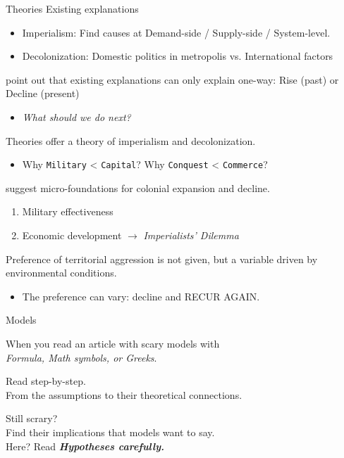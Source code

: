 \documentclass[xcolor=dvipsnames]{beamer}
\begin{document}
	\begin{frame}[fragile]{Theories}
		Existing explanations
		\begin{itemize}
			\item Imperialism: Find causes at Demand-side / Supply-side / System-level.
			\item Decolonization: Domestic politics in metropolis vs. International factors
		\end{itemize}
		\cite{Gartzke2011} point out that existing explanations can only explain one-way: \pause Rise (past) or Decline (present)  \pause
		\begin{itemize}
			\item[] \centering\textit{What should we do next?}
		\end{itemize}
		
	\end{frame}
	
	\begin{frame}[fragile]{Theories}
		\citet{Gartzke2011} offer a theory of imperialism and decolonization.
		\begin{itemize}
			\item Why \texttt{Military} < \texttt{Capital}? Why \texttt{Conquest} < \texttt{Commerce}?
		\end{itemize}\pause
		\citet{Gartzke2011} suggest micro-foundations for colonial expansion and decline. \pause
		\begin{enumerate}
			\item Military effectiveness
			\item Economic development $\rightarrow$ \textit{Imperialists' Dilemma}
		\end{enumerate}\pause
		Preference of territorial aggression is not given, but a variable driven by environmental conditions.\pause
		\begin{itemize}
			\item The preference can vary: decline and RECUR AGAIN.
		\end{itemize}
	\end{frame}
	
	\begin{frame}[fragile]{Models}
		\begin{center}
			When you read an article with scary models with\\\textit{Formula, Math symbols, or Greeks}.\pause
		\end{center}
		\begin{center}
			Read step-by-step.\\From the assumptions to their theoretical connections.\pause
		\end{center}
		\begin{center}
			Still scrary?\pause \\
			Find their implications that models want to say.\pause \\
			Here? Read \textit{\textbf{Hypotheses carefully.}}
		\end{center}
	\end{frame}
	
\end{document}
